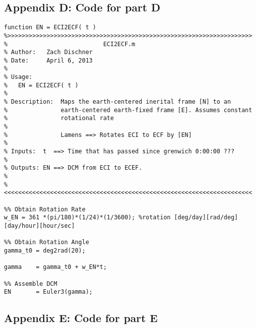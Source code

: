 \documentclass[11pt]{aiaa-tc}%
\begin{document}
\subsection{Appendix D: Code for part D}

\label{APP:Code for Part D}
\begin{lstlisting}
function EN = ECI2ECF( t )
%>>>>>>>>>>>>>>>>>>>>>>>>>>>>>>>>>>>>>>>>>>>>>>>>>>>>>>>>>>>>>>>>>>>>> 
%                           ECI2ECF.m
% Author:   Zach Dischner
% Date:     April 6, 2013
% 
% Usage:
%   EN = ECI2ECF( t )
%
% Description:  Maps the earth-centered inerital frame [N] to an
%               earth-centered earth-fixed frame [E]. Assumes constant
%               rotational rate
% 
%               Lamens ==> Rotates ECI to ECF by [EN]
% 
% Inputs:  t  ==> Time that has passed since grenwich 0:00:00 ???
%
% Outputs: EN ==> DCM from ECI to ECEF.
% 
%<<<<<<<<<<<<<<<<<<<<<<<<<<<<<<<<<<<<<<<<<<<<<<<<<<<<<<<<<<<<<<<<<<<<<<

%% Obtain Rotation Rate
w_EN = 361 *(pi/180)*(1/24)*(1/3600); %rotation [deg/day][rad/deg][day/hour][hour/sec]

%% Obtain Rotation Angle
gamma_t0 = deg2rad(20);

gamma    = gamma_t0 + w_EN*t;

%% Assemble DCM
EN       = Euler3(gamma);
\end{lstlisting}



\subsection{Appendix E: Code for part E}
\end{document}
